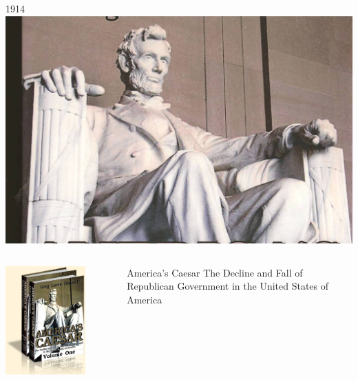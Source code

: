 
\usepackage[utf8]{inputenc}
\def\braces#1{[#1]}


\begin{frame}{1914}
    \centering
    \includegraphics[width=.9\textwidth]{img/lincoln-memorial.jpg} \\
\end{frame}

\begin{frame}
    \begin{columns}[onlytextwidth]
            \centering
            \includegraphics[width=0.75\textwidth]{img/americas-caesar.png} \\

            \begin{block}{America's Caesar}
                The Decline and Fall of Republican Government in the United States of America
            \end{block}
    \end{columns}
\end{frame}

